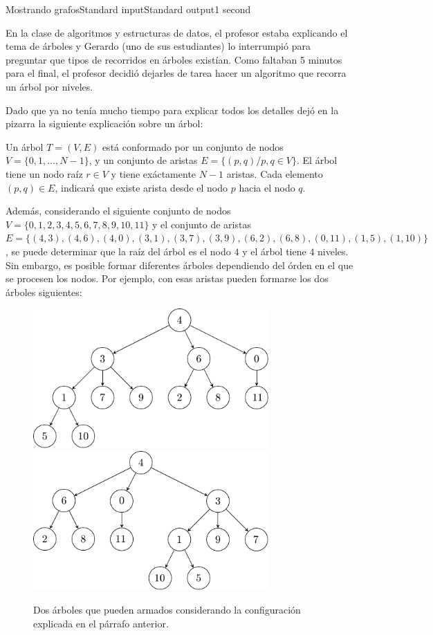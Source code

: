 \begin{problem}{Mostrando grafos}{Standard input}{Standard output}{1 second}{}


En la clase de algoritmos y estructuras de datos, el profesor estaba explicando el tema de árboles y Gerardo (uno de sus estudiantes) lo interrumpió para preguntar que tipos de recorridos en árboles existían. Como faltaban 5 minutos para el final, el profesor decidió dejarles de tarea hacer un algoritmo que recorra un árbol por niveles.

Dado que ya no tenía mucho tiempo para explicar todos los detalles dejó en la pizarra  la siguiente explicación sobre un árbol:

Un \'arbol $ T = (V, E)$ está conformado por un conjunto de nodos $V = \lbrace 0, 1, \dots, N-1\rbrace$, y un conjunto de aristas $E = \lbrace (p, q) / p, q \in V \rbrace$. El árbol tiene un nodo ra\'iz $r \in V$ y tiene exáctamente $N-1$ aristas. Cada elemento $(p, q) \in E$, indicar\'a que existe arista desde el nodo $p$ hacia el nodo $q$.

Además, considerando el siguiente conjunto de nodos $V = \lbrace 0, 1, 2, 3, 4, 5, 6, 7, 8, 9, 10, 11 \rbrace$ y el conjunto de aristas $E=\lbrace(4,3), (4, 6), (4, 0), (3, 1), (3, 7), (3, 9), (6, 2), (6, 8), (0, 11), (1, 5), (1, 10)\rbrace$, se puede determinar que la raíz del árbol es el nodo $4$ y el árbol tiene $4$ niveles. Sin embargo, es posible formar diferentes árboles dependiendo del órden en el que se procesen los nodos. Por ejemplo, con esas aristas pueden formarse los dos árboles siguientes:

\begin{figure}[h]
\centering
  \includegraphics[width=9cm]{images/tree.pdf}
  \includegraphics[width=9cm]{images/tree2.pdf}
  \caption{Dos árboles que pueden armados considerando la configuración explicada en el párrafo anterior.}
\end{figure}


\end{problem}
